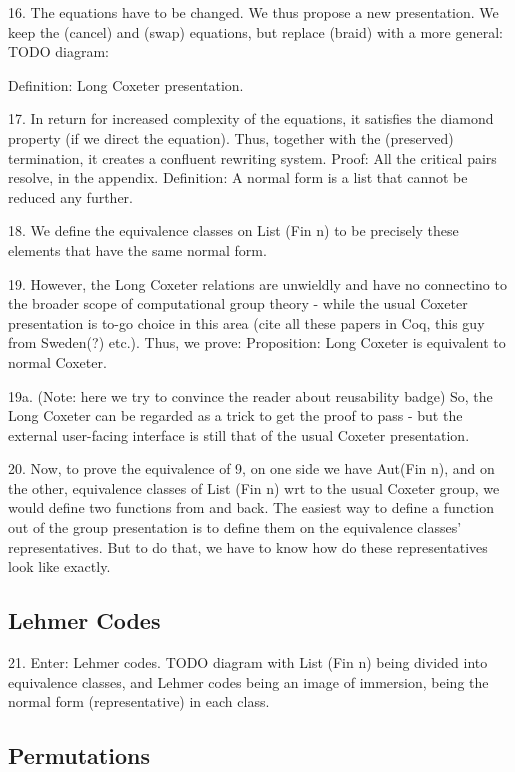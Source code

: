 16. The equations have to be changed. We thus propose a new presentation.
We keep the (cancel) and (swap) equations, but replace (braid) with a more
general:
TODO diagram:

Definition: Long Coxeter presentation.

17. In return for increased complexity of the equations, it satisfies the
diamond property (if we direct the equation). Thus, together with the
(preserved) termination, it creates a confluent rewriting system.
Proof: All the critical pairs resolve, in the appendix.
Definition: A normal form is a list that cannot be reduced any further.

18. We define the equivalence classes on List (Fin n) to be precisely these
elements that have the same normal form.

19. However, the Long Coxeter relations are unwieldly and have no
connectino to the broader scope of computational group theory - while the
usual Coxeter presentation is to-go choice in this area (cite all these
papers in Coq, this guy from Sweden(?) etc.).
Thus, we prove:
Proposition: Long Coxeter is equivalent to normal Coxeter.

19a. (Note: here we try to convince the reader about reusability badge) So,
the Long Coxeter can be regarded as a trick to get the proof to pass - but
the external user-facing interface is still that of the usual Coxeter
presentation.

20. Now, to prove the equivalence of 9, on one side we have Aut(Fin n), and
on the other, equivalence classes of List (Fin n) wrt to the usual Coxeter
group, we would define two functions from and back. The easiest way to
define a function out of the group presentation is to define them on the
equivalence classes' representatives. But to do that, we have to know how
do these representatives look like exactly.

\subsection{Lehmer Codes}

21. Enter: Lehmer codes.
TODO diagram with List (Fin n) being divided into equivalence classes, and
Lehmer codes being an image of immersion, being the normal form
(representative) in each class.

\subsection{Permutations}~\label{subsec:permutations}

